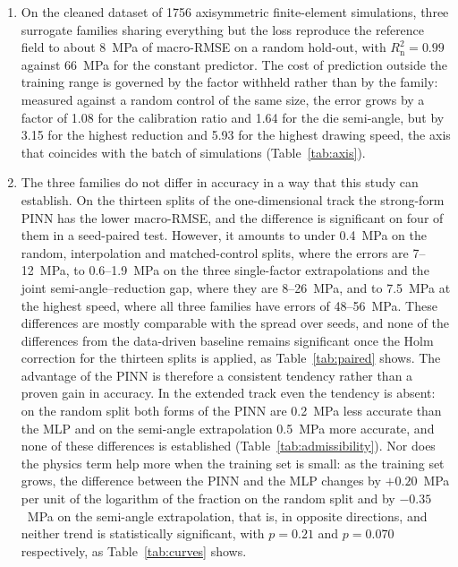 \documentclass[pdflatex,sn-basic,Numbered]{sn-jnl}
\begin{document}
\begin{enumerate}

\item On the cleaned dataset of 1756 axisymmetric finite-element simulations, three surrogate families sharing everything but the loss reproduce the reference field to about 8~MPa of macro-RMSE on a random hold-out, with $R^2_{\mathrm{n}} = 0.99$ against 66~MPa for the constant predictor. The cost of prediction outside the training range is governed by the factor withheld rather than by the family: measured against a random control of the same size, the error grows by a factor of 1.08 for the calibration ratio and 1.64 for the die semi-angle, but by 3.15 for the highest reduction and 5.93 for the highest drawing speed, the axis that coincides with the batch of simulations (Table~\ref{tab:axis}).

\item The three families do not differ in accuracy in a way that this study can establish. On the thirteen splits of the one-dimensional track the strong-form PINN has the lower macro-RMSE, and the difference is significant on four of them in a seed-paired test. However, it amounts to under 0.4~MPa on the random, interpolation and matched-control splits, where the errors are 7--12~MPa, to 0.6--1.9~MPa on the three single-factor extrapolations and the joint semi-angle--reduction gap, where they are 8--26~MPa, and to 7.5~MPa at the highest speed, where all three families have errors of 48--56~MPa. These differences are mostly comparable with the spread over seeds, and none of the differences from the data-driven baseline remains significant once the Holm correction for the thirteen splits is applied, as Table~\ref{tab:paired} shows. The advantage of the PINN is therefore a consistent tendency rather than a proven gain in accuracy. In the extended track even the tendency is absent: on the random split both forms of the PINN are 0.2~MPa less accurate than the MLP and on the semi-angle extrapolation 0.5~MPa more accurate, and none of these differences is established (Table~\ref{tab:admissibility}). Nor does the physics term help more when the training set is small: as the training set grows, the difference between the PINN and the MLP changes by $+0.20$~MPa per unit of the logarithm of the fraction on the random split and by $-0.35$~MPa on the semi-angle extrapolation, that is, in opposite directions, and neither trend is statistically significant, with $p=0.21$ and $p=0.070$ respectively, as Table~\ref{tab:curves} shows.


\end{enumerate}
\end{document}
